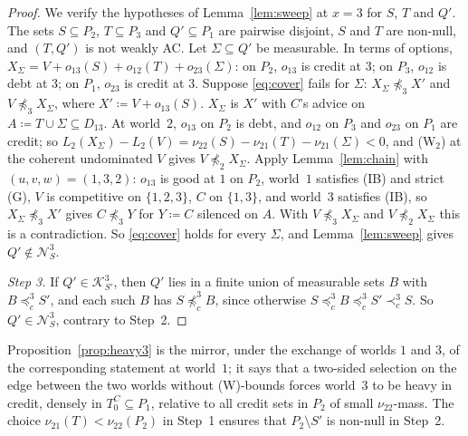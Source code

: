 \documentclass[11pt]{article}
\theoremstyle{definition}\newtheorem{definition}[theorem]{Definition}
\theoremstyle{remark}\newtheorem{remark}[theorem]{Remark}
\newcommand{\Kid}{\mathcal K}
\newcommand{\Nid}{\mathcal N}
\begin{document}
\begin{proof}
We verify the hypotheses of Lemma~\ref{lem:sweep} at $x=3$ for $S$, $T$ and
$Q'$. The sets $S\subseteq P_2$, $T\subseteq P_3$ and $Q'\subseteq P_1$ are
pairwise disjoint, $S$ and $T$ are non-null, and $(T,Q')$ is not weakly AC.
Let $\Sigma\subseteq Q'$ be measurable. In terms of options,
$X_\Sigma=V+o_{13}(S)+o_{12}(T)+o_{23}(\Sigma)$: on $P_2$, $o_{13}$ is
credit at $3$; on $P_3$, $o_{12}$ is debt at $3$; on $P_1$, $o_{23}$ is
credit at $3$. Suppose \eqref{eq:cover} fails for $\Sigma$:
$X_\Sigma\not\preceq_3X'$ and $V\not\preceq_3X_\Sigma$, where
$X'\coloneqq V+o_{13}(S)$. $X_\Sigma$ is $X'$ with $C$'s advice on
$A\coloneqq T\cup\Sigma\subseteq D_{13}$. At world~$2$, $o_{13}$ on $P_2$ is
debt, and $o_{12}$ on $P_3$ and $o_{23}$ on $P_1$ are credit; so
$L_2(X_\Sigma)-L_2(V)=\nu_{22}(S)-\nu_{21}(T)-\nu_{21}(\Sigma)<0$, and
(W$_2$) at the coherent undominated $V$ gives $V\not\preceq_2X_\Sigma$.
Apply Lemma~\ref{lem:chain} with $(u,v,w)=(1,3,2)$: $o_{13}$ is good at
$1$ on $P_2$, world~$1$ satisfies (IB) and strict (G), $V$ is competitive on
$\{1,2,3\}$, $C$ on $\{1,3\}$, and world~$3$ satisfies (IB), so
$X_\Sigma\not\preceq_3X'$ gives $C\not\preceq_3Y$ for $Y\coloneqq C$
silenced on $A$. With $V\not\preceq_3X_\Sigma$ and $V\not\preceq_2X_\Sigma$
this is a contradiction. So \eqref{eq:cover} holds for every $\Sigma$, and
Lemma~\ref{lem:sweep} gives $Q'\notin\Nid^3_S$.

\emph{Step 3.} If $Q'\in\Kid^3_{S'}$, then $Q'$ lies in a finite union of
measurable sets $B$ with $B\preceq^3_cS'$, and each such $B$ has
$S\not\preceq^3_cB$, since otherwise $S\preceq^3_cB\preceq^3_cS'\prec^3_cS$.
So $Q'\in\Nid^3_S$, contrary to Step~2.
\end{proof}

Proposition~\ref{prop:heavy3} is the mirror, under the exchange of worlds
$1$ and $3$, of the corresponding statement at world~$1$; it says that a
two-sided selection on the edge between the two worlds without (W)-bounds
forces world~$3$ to be heavy in credit, densely in $T^C_0\subseteq P_1$,
relative to all credit sets in $P_2$ of small $\nu_{22}$-mass. The choice
$\nu_{21}(T)<\nu_{22}(P_2)$ in Step~1 ensures that $P_2\setminus S'$ is
non-null in Step~2.
\end{document}
